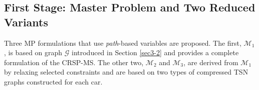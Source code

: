 \documentclass[12pt]{article}
\begin{document}








\subsection{First Stage: Master Problem and Two Reduced Variants}\label{sec4-1}
Three MP formulations that use \textit{path}-based variables are proposed. The first, $\mathcal{M}_1$, is based on graph $\mathcal{G}$ introduced in Section \ref{sec3-2} and provides a complete formulation of the CRSP-MS. The other two, $\mathcal{M}_2$ and $\mathcal{M}_3$, are derived from $\mathcal{M}_1$ by relaxing selected constraints and are based on two types of compressed TSN graphs constructed for each car.
\end{document}
